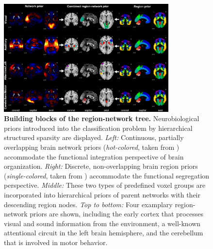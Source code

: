 \documentclass{article}
\begin{document}
\begin{figure}
\centering
\includegraphics[width=0.8\textwidth]{../figures/reg_net_prior_colin.pdf}
\vspace{-0.2cm}
\caption{\textbf{Building blocks of the region-network tree.}
Neurobiological priors introduced into the classification problem 
by hierarchical structured sparsity are displayed.
\textit{Left:} Continuous, partially overlapping brain network priors
(\textit{hot-colored}, taken from \cite{smith2009})
accommodate the functional integration
perspective of brain organization.
\textit{Right:} Discrete, non-overlapping brain region priors
(\textit{single-colored}, taken from \cite{crad12})
accommodate the functional segregation perspective.
\textit{Middle:} These two types of predefined voxel groups are incorporated
into hierarchical priors of parent networks with their
descending region nodes.
\textit{Top to bottom:} Four examplary region-network priors
are shown, including
the early cortex that processes
visual and sound information from the environment,
a well-known attentional circuit in the left brain hemisphere,
and
the cerebellum that is involved in motor behavior.
}
\label{fig_priors}
\end{figure}
\end{document}
